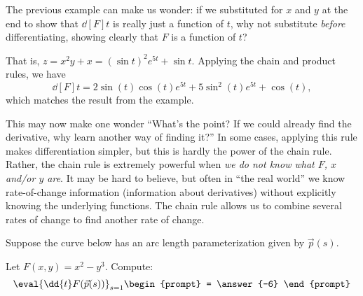 \documentclass{ximera}
\begin{document}
The previous example can make us wonder: if we substituted for $x$ and
$y$ at the end to show that $\dd[F]{t}$ is really just a function of
$t$, why not substitute \textit{before} differentiating, showing
clearly that $F$ is a function of $t$?

That is, $z = x^2y+x = (\sin t)^2e^{5t}+\sin t.$ Applying the chain
and product rules, we have
\[
\dd[F]{t} = 2\sin(t)\cos(t) e^{5t}+ 5\sin^2(t) e^{5t}+\cos(t),
\]
which matches the result from the example.

This may now make one wonder ``What's the point? If we could already
find the derivative, why learn another way of finding it?'' In some
cases, applying this rule makes differentiation simpler, but this is
hardly the power of the chain rule. Rather, the chain rule is
extremely powerful when \textit{we do not know what $F$, $x$ and/or
  $y$ are}. It may be hard to believe, but often in ``the real world''
we know rate-of-change information (information about derivatives)
without explicitly knowing the underlying functions. The chain rule
allows us to combine several rates of change to find another rate of
change.


\begin{question}
  Suppose the curve below has an arc length parameterization given
  by $\vec{p}(s)$.
  \begin{image}
  \end{image}
  Let $F(x,y) = x^2 - y^3$. Compute:
  \[
  \eval{\dd{t}F(\vec{p}(s))}_{s=1} 
  \begin{prompt}
    = \answer{-6}
  \end{prompt}
  \]
\end{question}
\end{document}
